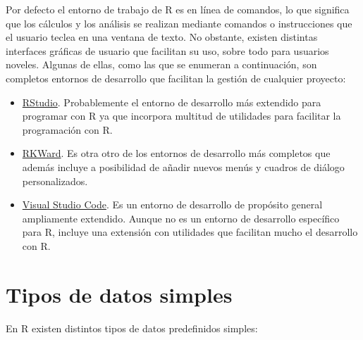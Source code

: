 \documentclass[
  a4paper,
]{scrreport}
\theoremstyle{definition}
\theoremstyle{definition}
\theoremstyle{remark}
\begin{document}
Por defecto el entorno de trabajo de R es en línea de comandos, lo que
significa que los cálculos y los análisis se realizan mediante comandos
o instrucciones que el usuario teclea en una ventana de texto. No
obstante, existen distintas interfaces gráficas de usuario que facilitan
su uso, sobre todo para usuarios noveles. Algunas de ellas, como las que
se enumeran a continuación, son completos entornos de desarrollo que
facilitan la gestión de cualquier proyecto:

\begin{itemize}
\item
  \href{https://www.rstudio.com/}{RStudio}. Probablemente el entorno de
  desarrollo más extendido para programar con R ya que incorpora
  multitud de utilidades para facilitar la programación con R.
\item
  \href{https://rkward.kde.org}{RKWard}. Es otra otro de los entornos de
  desarrollo más completos que además incluye a posibilidad de añadir
  nuevos menús y cuadros de diálogo personalizados.
\item
  \href{https://code.visualstudio.com/}{Visual Studio Code}. Es un
  entorno de desarrollo de propósito general ampliamente extendido.
  Aunque no es un entorno de desarrollo específico para R, incluye una
  extensión con utilidades que facilitan mucho el desarrollo con R.
\end{itemize}


\hypertarget{tipos-de-datos-simples}{%
\chapter{Tipos de datos simples}\label{tipos-de-datos-simples}}

En R existen distintos tipos de datos predefinidos simples:
\end{document}
